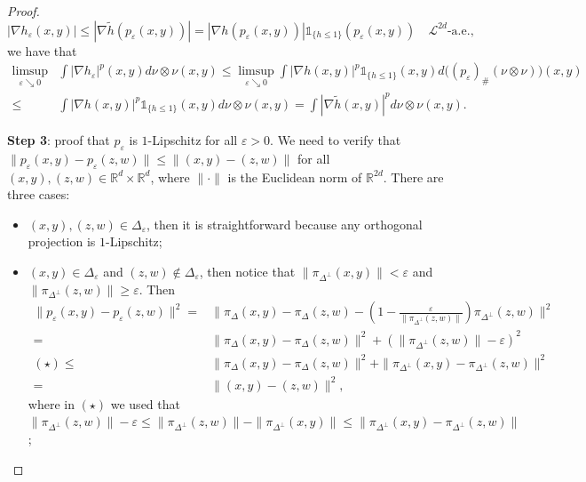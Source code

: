 \documentclass[10pt,leqno]{amsart}
\numberwithin{equation}{section}
\newcommand{\R}{\mathbb{R}}
\begin{document}
\begin{proof}
    \[|\nabla h_\varepsilon(x,y)| \leq |\nabla \tilde{h}(p_\varepsilon(x,y))| = |\nabla h(p_\varepsilon(x,y))| \mathds{1}_{\{h\leq 1\}}(p_\varepsilon(x,y)) \quad \mathcal{L}^{2d}\text{-a.e.},\] 
    we have that 
    \begin{align*}
        \limsup_{\varepsilon\searrow 0} &  \int |\nabla h_\varepsilon|^p(x,y) d\nu\otimes \nu(x,y) \leq \limsup_{\varepsilon\searrow 0} \int |\nabla h(x,y)|^p\mathds{1}_{ \{h\leq 1\} } (x,y ) d\big((p_\varepsilon)_\#(\nu \otimes \nu)\big)(x,y) 
        \\
        \leq & 
        \int |\nabla h(x,y)|^p\mathds{1}_{\{h\leq 1\}}(x,y) d\nu\otimes \nu(x,y) = \int |\nabla \tilde{h}(x,y)|^p d\nu\otimes \nu(x,y).
    \end{align*}

    \textbf{Step 3}: proof that $p_\varepsilon$ is $1$-Lipschitz for all $\varepsilon>0$. We need to verify that $\|p_\varepsilon(x,y) - p_\varepsilon(z,w)\| \leq \|(x,y) - (z,w)\|$ for all $(x,y),(z,w)\in \R^d\times \R^d$, where $\|\cdot\|$ is the Euclidean norm of $\R^{2d}$. There are three cases:
    \begin{itemize}
        \item $(x,y),(z,w) \in \Delta_\varepsilon$, then it is straightforward because any orthogonal projection is $1$-Lipschitz;
        \item $(x,y)\in \Delta_\varepsilon$ and $(z,w)\notin \Delta_\varepsilon$, then notice that $\|\pi_{\Delta^\perp}(x,y)\|<\varepsilon$ and $\|\pi_{\Delta^\perp}(z,w)\|\geq \varepsilon$. Then
        \begin{align*}
            \|p_\varepsilon(x,y) - p_\varepsilon(z,w)\|^2 
             = &
            \| \pi_\Delta(x,y) - \pi_\Delta(z,w) -\left(1- \frac{\varepsilon}{\|\pi_{\Delta^\perp}(z,w)\|} \right)\pi_{\Delta^\perp}(z,w) \|^2
            \\
             = &
            \|\pi_\Delta(x,y) - \pi_\Delta(z,w)\|^2 + \left(\|\pi_{\Delta^\perp}(z,w)\| - \varepsilon\right)^2
            \\
            (\star) \leq &
            \|\pi_\Delta(x,y) - \pi_\Delta(z,w)\|^2 + \|\pi_{\Delta^\perp}(x,y) - \pi_{\Delta^\perp}(z,w)\|^2 
            \\
            = & \|(x,y) - (z,w)\|^2,
        \end{align*}
        where in $(\star)$ we used that $\|\pi_{\Delta^\perp}(z,w)\| - \varepsilon\leq \|\pi_{\Delta^\perp}(z,w)\| - \|\pi_{\Delta^\perp}(x,y)\|\leq \|\pi_{\Delta^\perp}(x,y) - \pi_{\Delta^\perp}(z,w)\|$;

\end{itemize}
\end{proof}
\end{document}
